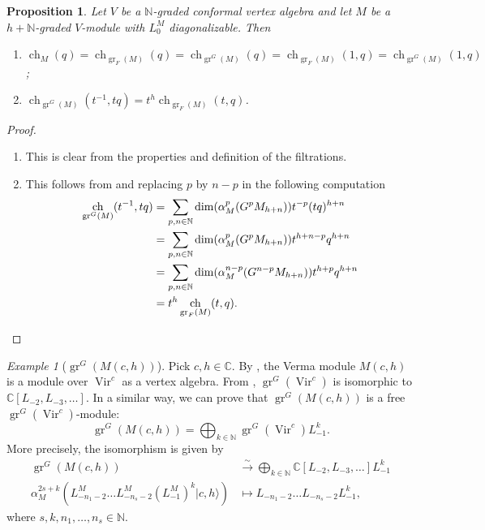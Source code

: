 \documentclass[a4paper, 12pt, reqno]{amsart}
\newtheorem{proposition}[theorem]{Proposition}
\theoremstyle{remark}
\newtheorem{example}[theorem]{Example}
\numberwithin{equation}{subsection}
\DeclareMathOperator{\Vir}{Vir}
\DeclareMathOperator{\gr}{gr}
\DeclareMathOperator{\ch}{ch}
\begin{document}
\begin{proposition}
  \label{prp:13}
  Let $V$ be a $\mathbb{N}$-graded conformal vertex algebra and let $M$ be a $h + \mathbb{N}$-graded $V$-module with $L_0^M$ diagonalizable.
  Then
  \begin{enumerate}
  \item $\ch_M(q) = \ch_{\gr_F(M)}(q) = \ch_{\gr^G(M)}(q) = \ch_{\gr_F(M)}(1, q) = \ch_{\gr^G(M)}(1, q)$;
  \item $\ch_{\gr^G(M)}(t^{-1}, tq) = t^h\ch_{\gr_F(M)}(t, q)$.
  \end{enumerate}
\end{proposition}

\begin{proof}\leavevmode
  \begin{enumerate}
  \item This is clear from the properties and definition of the filtrations.
  \item This follows from  and replacing $p$ by $n - p$ in the following computation
    \begin{align*}
    \ch_{\gr^G(M)}(t^{-1}, tq) &= \sum_{p, n \in \mathbb{N}}\dim(\alpha^p_M(G^pM_{h + n}))t^{-p}(tq)^{h+n} \\
    &= \sum_{p, n \in \mathbb{N}}\dim(\alpha^p_M(G^pM_{h + n}))t^{h + n - p}q^{h + n} \\
    &= \sum_{p, n \in \mathbb{N}}\dim(\alpha^{n - p}_M(G^{n - p}M_{h + n}))t^{h + p}q^{h + n} \\
    &= t^h\ch_{\gr_F(M)}(t, q).\qedhere
    \end{align*}
  \end{enumerate}
\end{proof}

\begin{example}[$\gr^G(M(c, h))$]
  \label{exa:12}
  Pick $c, h \in \mathbb{C}$.
  By , the Verma module $M(c, h)$ is a module over $\Vir^c$ as a vertex algebra.
  From , $\gr^G(\Vir^c)$ is isomorphic to $\mathbb{C}[L_{-2}, L_{-3}, \dots]$.
  In a similar way, we can prove that $\gr^G(M(c, h))$ is a free $\gr^G(\Vir^c)$-module:
  \begin{equation*}
    \gr^G(M(c, h)) = \bigoplus_{k \in \mathbb{N}}\gr^G(\Vir^c)L_{-1}^k.
  \end{equation*}
  More precisely, the isomorphism is given by
  \begin{align*}
    \gr^G(M(c, h)) &\xrightarrow{\sim} \bigoplus_{k \in \mathbb{N}}\mathbb{C}[L_{-2}, L_{-3}, \dots]L_{-1}^k \\
    \alpha_M^{2s + k}(L_{-n_1 - 2}^M\dots L_{-n_s - 2}^M(L_{-1}^M)^k|c, h\rangle) &\mapsto L_{-n_1 - 2}\dots L_{-n_s - 2}L_{-1}^k,
  \end{align*}
  where $s, k, n_1, \dots, n_s \in \mathbb{N}$.
\end{example}
\end{document}
